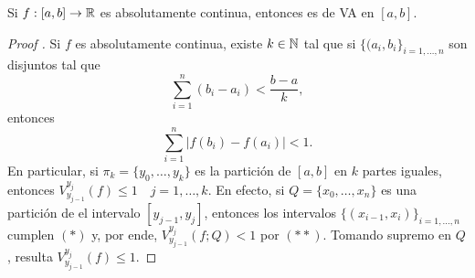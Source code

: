 \begin{theorem}
	Si $f : [a,b] \to \mathbb{R}$ es absolutamente continua, entonces es de VA en $[a,b]$.
\end{theorem}
\begin{proof}[Proof ]
	Si $f$ es absolutamente continua, existe $k \in \mathbb{N}$ tal que si $\{(a_{i},b_{i}\} _{i=1,\dots,n}$ son disjuntos tal que 
	\[ \sum_{i=1}^{n} (b_{i} - a_{i}) < \frac{b-a}{k}, \tag{$*$}\]
	entonces
	\[ \sum_{i=1}^{n} |f(b_{i}) - f(a_{i})| < 1. \tag{$* *$}\]
	En particular, si $\pi_{k} = \{y_{0},\dots,y_{k}\}$ es la partición de $[a,b]$ en $k$ partes iguales, entonces $V_{y_{j-1}}^{y_{j}}(f) \leq 1 \quad j=1,\dots,k$.  En efecto, si $Q = \{x_{0},\dots,x_{n}\}$ es una partición de el intervalo $[y_{j-1},y_{j}]$, entonces los intervalos $\{(x_{i-1},x_{i})\}_{i=1,\dots,n}$ cumplen $(*)$ y, por ende, $V_{y_{j-1}}^{y_{j}}(f;Q) < 1$ por $(* *)$. Tomando supremo en $Q$, resulta $V_{y_{j-1}}^{y_{j}}(f) \leq 1$.
\end{proof}
